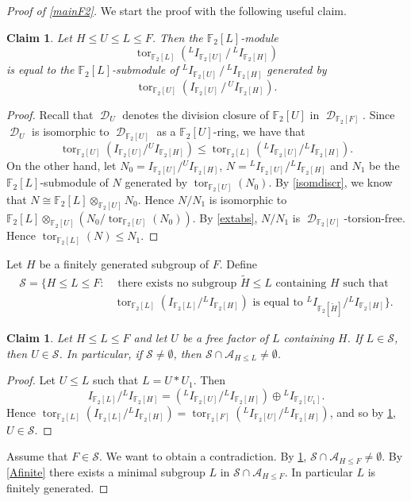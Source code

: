 \documentclass{amsart}
\newtheorem{claim}[lem]{Claim}
\theoremstyle{definition}
\theoremstyle{remark}
\DeclareMathOperator{\D}{\mathcal D}
\DeclareMathOperator{\tor}{tor}
\newcommand{\F}{\mathbb{F}}
\begin{document}
\begin{proof}[Proof of \cref{mainF2}] We start the proof with the following useful claim.
\begin{claim} \label{indtor} 
Let $H \leq U \leq L \leq F$.  
Then the $\mathbb{F}_2[L]$-module 
\[
\tor_{\mathbb{F}_2[L]}\!\left({}^L I_{\mathbb{F}_2[U]} \,\big/\, {}^L I_{\mathbb{F}_2[H]}\right)
\]
is equal to the $\mathbb{F}_2[L]$-submodule of 
$
{}^L I_{\mathbb{F}_2[U]} \,\big/\, {}^L I_{\mathbb{F}_2[H]}
$
generated by 
\[
\tor_{\mathbb{F}_2[U]}\!\left(I_{\mathbb{F}_2[U]} \,\big/\, {}^U I_{\mathbb{F}_2[H]}\right).
\]
\end{claim}

\begin{proof} Recall  that $\D_U$ denotes the division closure of $\F_2[U]$ in $\D_{\F_2[F]}$. Since $\D_U$ is isomorphic to $\D_{\F_2[U]}$ as a $\F_2[U]$-ring, we have that 
$$\tor_{\F_2[U]} ( I_{\F_2[U]}/{}^UI_{\F_2[H]})\le \tor_{\F_2[L]}({}^LI_{\F_2[U]}/{}^LI_{\F_2[H]}).$$ 
On the other hand, let $N_0= I_{\F_2[U]}/{}^UI_{\F_2[H]}$,  $N={}^LI_{\F_2[U]}/{}^LI_{\F_2[H]}$ and $N_1$ be  the $\F_2[L]$-submodule of $N$ generated by 
$\tor_{\F_2[U]}(N_0)$.
By \cref{isomdiscr}, we know that $N\cong \F_2[L]\otimes_{\F_2[U]} N_0$. Hence $N/N_1$ is isomorphic to    $\F_2[L]\otimes_{\F_2[U]} (N_0/\tor_{\F_2[U]}(N_0))$. By  \cref{extabs}, $N/N_1$  is $\D_{\F_2[U]}$-torsion-free. Hence 
$\tor_{\F_2[L]}(N)\le N_1.$ 
\renewcommand\qedsymbol{$\diamond$}\end{proof}


Let   $H$ be a finitely generated subgroup of $F$. Define
\begin{align*}\mathcal S=  \{H\le L\le F: & \textrm{ there exists no subgroup $\widetilde H\le L$ containing $H$ such that}  \\ & \tor_{\F_2[L]}(I_{\F_2[L]}/{}^LI_{\F_2[H]}) 
\textrm{ is equal 
to\ } 
{}^L I_{\F_2[\widetilde H]}/{}^LI_{\F_2[H]} \}.\end{align*}
\begin{claim}\label{nonex} Let $H\le L\le F$ and let $U$ be a free factor  of $L$  containing $H$. If $L\in \mathcal S$, then $U\in \mathcal S$.  
In particular,  if $\mathcal S\ne \emptyset$, then  $\mathcal S\cap  \mathcal A_{H\leq L}\neq \emptyset$.  
\end{claim}
\begin{proof}  \renewcommand\qedsymbol{$\diamond$}   Let $U\leq L$ such that $L=U*U_1$. Then 
  $$I_{\F_2[L]}/{}^LI_{\F_2[H]}=\left ({}^{L}I_{\F_2[U]}/{}^LI_{\F_2[H]}\right ) \oplus {}^LI_{\F_2[U_1]}.$$
  Hence $\tor_{\F_2[L]}(I_{\F_2[L]}/{}^LI_{\F_2[H]})=\tor_{\F_2[F]}({}^{L}I_{\F_2[U]}/{}^LI_{\F_2[H]})$, and so by \cref{indtor}, $U\in \mathcal S$.
\renewcommand\qedsymbol{$\diamond$}\end{proof}
Assume that  $F\in \mathcal S$. We want to obtain a contradiction.
 By \cref{nonex}, $ \mathcal S\cap  \mathcal A_{H\leq F} \neq \emptyset$.  By \cref{Afinite} there exists  a minimal subgroup $L$ in $\mathcal S\cap  \mathcal A_{H\leq F}$. In particular $L$ is finitely generated.


\end{proof}
\end{document}
